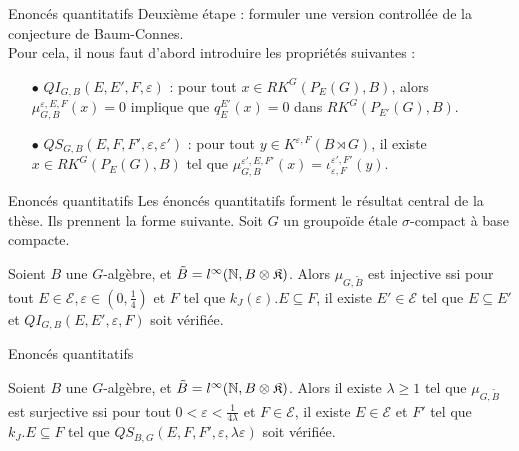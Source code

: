 \begin{frame}{Enoncés quantitatifs}
Deuxième étape : formuler une version controllée de la conjecture de Baum-Connes.\\
\vspace{0.3 cm}
Pour cela, il nous faut d'abord introduire les propriétés suivantes :\\
\begin{itemize}
\item[$\bullet$] $QI_{G,B}(E,E',F,\varepsilon)$ : pour tout $x\in RK^G(P_E(G), B )$, alors $\mu^{\varepsilon,E,F}_{G,B}(x) = 0$ implique que $q_E^{E'}(x)=0$ dans $RK^G(P_{E'}(G),B)$.
\item[$\bullet$] $QS_{G,B}(E,F,F',\varepsilon,\varepsilon')$ : pour tout $y\in K^{\varepsilon,F}(B\rtimes G)$, il existe $x\in RK^G(P_E(G),B)$ tel que $\mu^{\varepsilon',E,F'}_{G,B}(x)=\iota_{\varepsilon,F}^{\varepsilon',F'}(y)$.\\
\end{itemize} 
\end{frame}

\begin{frame}{Enoncés quantitatifs}
Les énoncés quantitatifs forment le résultat central de la thèse. Ils prennent la forme suivante. Soit $G$ un groupoïde étale $\sigma$-compact à base compacte.\\
\vspace{0.3 cm}
\begin{thmfr}
Soient $B$ une $G$-algèbre, et $\tilde B = l^\infty(\mathbb N,B\otimes\mathfrak K)$. Alors $\mu_{G,\tilde B}$ est injective ssi pour tout $E\in\mathcal E,\varepsilon\in(0,\frac{1}{4})$ et $F$ tel que $k_J(\varepsilon).E\subseteq F$, il existe $E' \in\mathcal E$ tel que $E\subseteq E'$ et $QI_{G,B}(E,E',\varepsilon,F)$ soit vérifiée.
\end{thmfr}
\end{frame}

\begin{frame}{Enoncés quantitatifs}
\begin{thmfr}
Soient $B$ une $G$-algèbre, et $\tilde B = l^\infty(\mathbb N,B\otimes\mathfrak K)$. Alors il existe $\lambda \geq 1$ tel que $\mu_{G,\tilde B}$ est surjective ssi pour tout $0<\varepsilon<\frac{1}{4\lambda}$ et $F\in\mathcal E$, il existe $E\in\mathcal E$ et $F'$ tel que $k_J .E \subseteq F$ tel que $QS_{B,G}(E,F,F',\varepsilon,\lambda\varepsilon)$ soit vérifiée.
\end{thmfr}
\end{frame}

